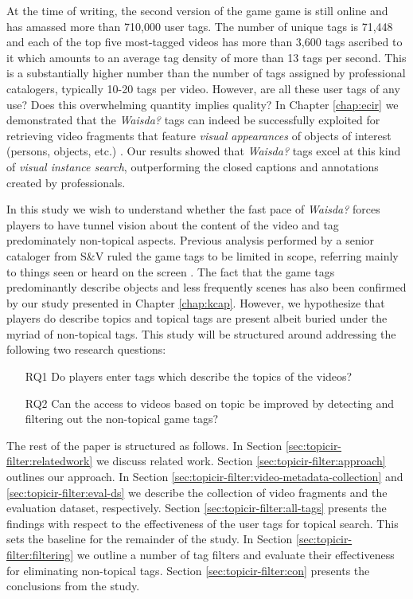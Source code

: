 At the time of writing, the second version of the game game is still online and has amassed more than 710,000 user tags. The number of unique tags is 71,448 and each of the top five most-tagged videos has more than 3,600 tags ascribed to it which amounts to an average tag density of more than 13 tags per second. This is a substantially higher number than the number of tags assigned by professional catalogers, typically 10-20 tags per video. However, are all these user tags of any use? Does this overwhelming quantity implies quality? In Chapter \ref{chap:ecir} we demonstrated that the \textit{Waisda?} tags can indeed be successfully exploited for retrieving video fragments that feature \textit{visual appearances} of objects of interest (persons, objects, etc.) \cite{ecir}. Our results showed that \textit{Waisda?} tags excel at this kind of \textit{visual instance search}, outperforming the closed captions and annotations created by professionals. 

In this study we wish to understand whether the fast pace of \textit{Waisda?} forces players to have tunnel vision about the content of the video and tag predominately non-topical aspects.
Previous analysis performed by a senior cataloger from S\&V ruled the game tags to be limited in scope, referring mainly to things seen or heard on the screen \cite{waisda-lotte,websciencepaper}. The fact that the game tags predominantly describe objects and less frequently scenes has also been confirmed by our study presented in Chapter \ref{chap:kcap}. However, we hypothesize that players do describe topics and topical tags are present albeit buried under the myriad of non-topical tags. This study will be structured around addressing the following two research questions:
\begin{itemize}
\item[RQ1] Do players enter tags which describe the topics of the videos?
\item[RQ2] Can the access to videos based on topic be improved by detecting and filtering out the non-topical game tags?
\end{itemize}

The rest of the paper is structured as follows. In Section \ref{sec:topicir-filter:relatedwork} we discuss related work. Section \ref{sec:topicir-filter:approach} outlines our approach. In Section \ref{sec:topicir-filter:video-metadata-collection} and \ref{sec:topicir-filter:eval-ds} we describe the collection of video fragments and the evaluation dataset, respectively. Section \ref{sec:topicir-filter:all-tags} presents the findings with respect to the effectiveness of the user tags for topical search. This sets the baseline for the remainder of the study. In Section \ref{sec:topicir-filter:filtering} we outline a number of tag filters and evaluate their effectiveness for eliminating non-topical tags. Section \ref{sec:topicir-filter:con} presents the conclusions from the study.

